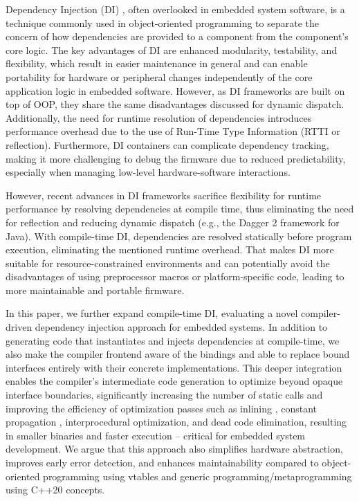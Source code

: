 \documentclass[10pt,sigplan,screen,anonymous]{acmart}
\begin{document}
Dependency Injection (DI) \cite{seemann2019dependency}, often overlooked in embedded system software, is a technique commonly used in object-oriented programming to separate the concern of how dependencies are provided to a component from the component's core logic. The key advantages of DI are enhanced modularity, testability, and flexibility, which result in easier maintenance in general and can enable portability for hardware or peripheral changes independently of the core application logic in embedded software. However, as DI frameworks are built on top of OOP, they share the same disadvantages discussed for dynamic dispatch. Additionally, the need for runtime resolution of dependencies introduces performance overhead due to the use of Run-Time Type Information (RTTI or reflection). Furthermore, DI containers can complicate dependency tracking, making it more challenging to debug the firmware due to reduced predictability, especially when managing low-level hardware-software interactions.


However, recent advances in DI frameworks sacrifice flexibility for runtime performance by resolving dependencies at compile time, thus eliminating the need for reflection and reducing dynamic dispatch (e.g., the Dagger 2 framework \cite{dagger2} for Java). With compile-time DI, dependencies are resolved statically before program execution, eliminating the mentioned runtime overhead. That makes DI more suitable for resource-constrained environments and can potentially avoid the disadvantages of using preprocessor macros or platform-specific code, leading to more maintainable and portable firmware.


In this paper, we further expand compile-time DI, evaluating a novel compiler-driven dependency injection approach for embedded systems. In addition to generating code that instantiates and injects dependencies at compile-time, we also make the compiler frontend aware of the bindings and able to replace bound interfaces entirely with their concrete implementations. This deeper integration enables the compiler's intermediate code generation to optimize beyond opaque interface boundaries, significantly increasing the number of static calls and improving the efficiency of optimization passes such as inlining \cite{damasio2021}, constant propagation \cite{wegman1985}, interprocedural optimization, and dead code elimination, resulting in smaller binaries and faster execution -- critical for embedded system development. We argue that this approach also simplifies hardware abstraction, improves early error detection, and enhances maintainability compared to object-oriented programming using vtables and generic programming/metaprogramming using C++20 concepts.
\end{document}
